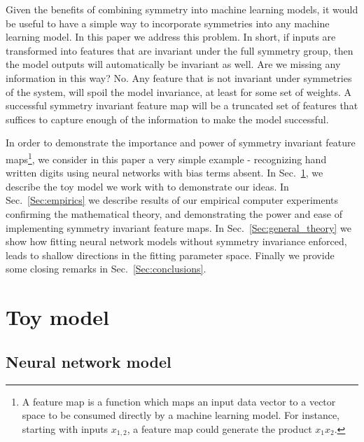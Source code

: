 \documentclass[onecolumn, nofootinbib, aps, pra, 11pt]{revtex4-1}
\begin{document}
Given the benefits of combining symmetry into machine learning models, it would be useful to have a simple way to incorporate symmetries into any machine learning model. In this paper we address this problem. In short, if inputs are transformed into features that are invariant under the full symmetry group, then the model outputs will automatically be invariant as well. Are we missing any information in this way? No. Any feature that is not invariant under symmetries of the system, will spoil the model invariance, at least for some set of weights. A successful symmetry invariant feature map will be a truncated set of features that suffices to capture enough of the information to make the model successful.

In order to demonstrate the importance and power of symmetry invariant feature maps\footnote{A feature map is a function which maps an input data vector to a vector space to be consumed directly by a machine learning model. For instance, starting with inputs $x_{1,2}$, a feature map could generate the product $x_1 x_2$.}, we consider in this paper a very simple example - recognizing hand written digits using neural networks with bias terms absent. In Sec.~\ref{Sec:model}, we describe the toy model we work with to demonstrate our ideas. In Sec.~\ref{Sec:empirics} we describe results of our empirical computer experiments confirming the mathematical theory, and demonstrating the power and ease of implementing symmetry invariant feature maps. In Sec.~\ref{Sec:general_theory} we show how fitting neural network models without symmetry invariance enforced, leads to shallow directions in the fitting parameter space. Finally we provide some closing remarks in Sec.~\ref{Sec:conclusions}.





\section{Toy model}\label{Sec:model}
\subsection{Neural network model}\label{Sec:dumb_NN}
\end{document}
